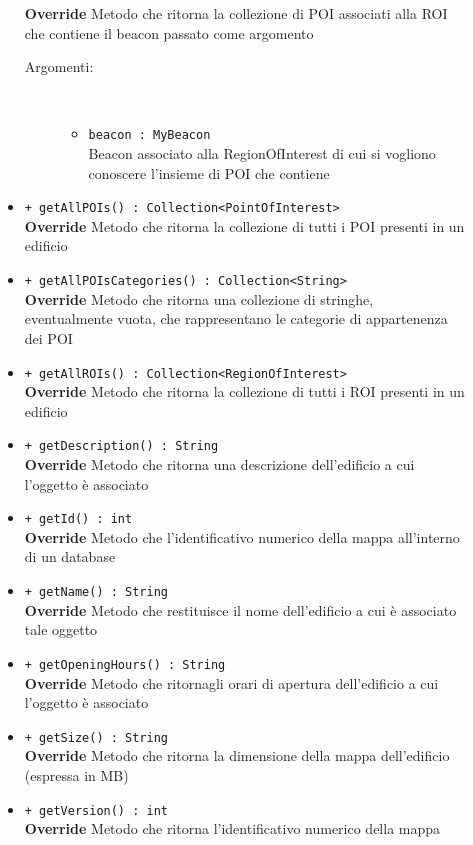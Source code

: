 \documentclass[../DefinizioneDiProdotto.tex]{subfiles}
\begin{document}
\begin{description}
\begin{itemize}
\textbf{Override} Metodo che ritorna la collezione di POI associati alla ROI che contiene il beacon passato come argomento
 \begin{description}
\item[Argomenti:] \
\begin{itemize}
\item \texttt{beacon : MyBeacon}\\
Beacon associato alla RegionOfInterest di cui si vogliono conoscere l'insieme di POI che contiene\end{itemize}
\end{description}
\item \texttt{+ getAllPOIs() : Collection<PointOfInterest>}\\
\textbf{Override} Metodo che ritorna la collezione di tutti i POI presenti in un edificio
 \item \texttt{+ getAllPOIsCategories() : Collection<String>}\\
\textbf{Override} Metodo che ritorna una collezione di stringhe, eventualmente vuota, che rappresentano le categorie di appartenenza dei POI
 \item \texttt{+ getAllROIs() : Collection<RegionOfInterest>}\\
\textbf{Override} Metodo che ritorna la collezione di tutti i ROI presenti in un edificio
 \item \texttt{+ getDescription() : String}\\
\textbf{Override} Metodo che ritorna una descrizione dell'edificio a cui l'oggetto è associato
 \item \texttt{+ getId() : int}\\
\textbf{Override} Metodo che l'identificativo numerico della mappa all'interno di un database
 \item \texttt{+ getName() : String}\\
\textbf{Override} Metodo che restituisce il nome dell'edificio a cui è associato tale oggetto
 \item \texttt{+ getOpeningHours() : String}\\
\textbf{Override} Metodo che ritornagli orari di apertura dell'edificio a cui l'oggetto è associato
 \item \texttt{+ getSize() : String}\\
\textbf{Override} Metodo che ritorna la dimensione della mappa dell'edificio (espressa in MB)
 \item \texttt{+ getVersion() : int}\\
\textbf{Override} Metodo che ritorna l'identificativo numerico della mappa

\end{itemize}
\end{description}
\end{document}
